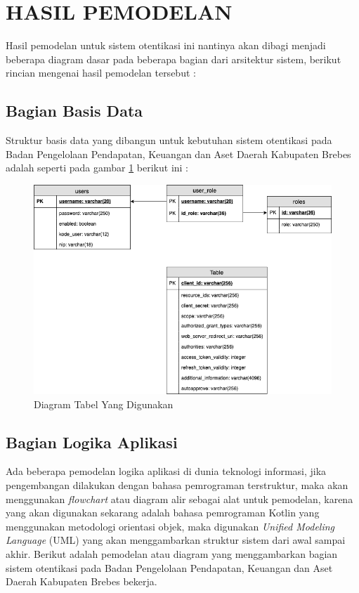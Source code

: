 \documentclass[pdftex,12pt, oneside]{article}
\begin{document}
\section{HASIL PEMODELAN}

Hasil pemodelan untuk sistem otentikasi ini nantinya akan dibagi menjadi beberapa diagram dasar pada beberapa bagian dari arsitektur sistem, berikut rincian mengenai hasil pemodelan tersebut :

\subsection{Bagian Basis Data}

Struktur basis data yang dibangun untuk kebutuhan sistem otentikasi pada Badan Pengelolaan Pendapatan, Keuangan dan Aset Daerah Kabupaten Brebes adalah seperti pada gambar \ref{fig:db-dia} berikut ini :

\begin{figure}[H]
	\centering
	\includegraphics[width=1\textwidth]{./resources/db-diagram}
	\caption{Diagram Tabel Yang Digunakan}
	\label{fig:db-dia}
\end{figure}


\subsection{Bagian Logika Aplikasi}

Ada beberapa pemodelan logika aplikasi di dunia teknologi informasi, jika pengembangan dilakukan dengan bahasa pemrograman terstruktur, maka akan menggunakan \textit{flowchart} atau diagram alir sebagai alat untuk pemodelan, karena yang akan digunakan sekarang adalah bahasa pemrograman Kotlin yang menggunakan metodologi orientasi objek, maka digunakan \textit{Unified Modeling Language} (UML) yang akan menggambarkan struktur sistem dari awal sampai akhir. Berikut adalah pemodelan atau diagram yang menggambarkan bagian sistem otentikasi pada Badan Pengelolaan Pendapatan, Keuangan dan Aset Daerah Kabupaten Brebes bekerja.
\end{document}
